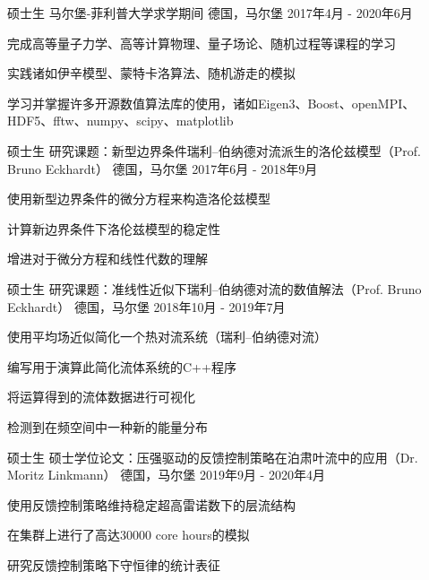 \begin{cventries}
  \cventry
    {硕士生} %
    {马尔堡-菲利普大学求学期间} %
    {德国，马尔堡} %
    {2017年4月 - 2020年6月} %
    {
      \begin{cvitems} %
        \item {完成高等量子力学、高等计算物理、量子场论、随机过程等课程的学习}
        \item {实践诸如伊辛模型、蒙特卡洛算法、随机游走的模拟}
        \item {学习并掌握许多开源数值算法库的使用，诸如Eigen3、Boost、openMPI、HDF5、fftw、numpy、scipy、matplotlib}
      \end{cvitems}
    }

  \cventry
    {硕士生} %
    {研究课题：新型边界条件瑞利--伯纳德对流派生的洛伦兹模型（Prof. Bruno Eckhardt）} %
    {德国，马尔堡} %
    {2017年6月 - 2018年9月} %
    {
      \begin{cvitems} %
        \item {使用新型边界条件的微分方程来构造洛伦兹模型}
        \item {计算新边界条件下洛伦兹模型的稳定性}
        \item {增进对于微分方程和线性代数的理解}
      \end{cvitems}
    }

  \cventry
    {硕士生} %
    {研究课题：准线性近似下瑞利--伯纳德对流的数值解法（Prof. Bruno Eckhardt）} %
    {德国，马尔堡} %
    {2018年10月 - 2019年7月} %
    {
      \begin{cvitems} %
        \item {使用平均场近似简化一个热对流系统（瑞利--伯纳德对流）}
        \item {编写用于演算此简化流体系统的C++程序}
        \item {将运算得到的流体数据进行可视化}
        \item {检测到在频空间中一种新的能量分布}
      \end{cvitems}
    }

  \cventry
    {硕士生} %
    {硕士学位论文：压强驱动的反馈控制策略在泊肃叶流中的应用（Dr. Moritz Linkmann）} %
    {德国，马尔堡} %
    {2019年9月 - 2020年4月} %
    {
      \begin{cvitems} %
        \item {使用反馈控制策略维持稳定超高雷诺数下的层流结构}
        \item {在集群上进行了高达30000 core hours的模拟}
        \item {研究反馈控制策略下守恒律的统计表征}
      \end{cvitems}
    }


\end{cventries}

